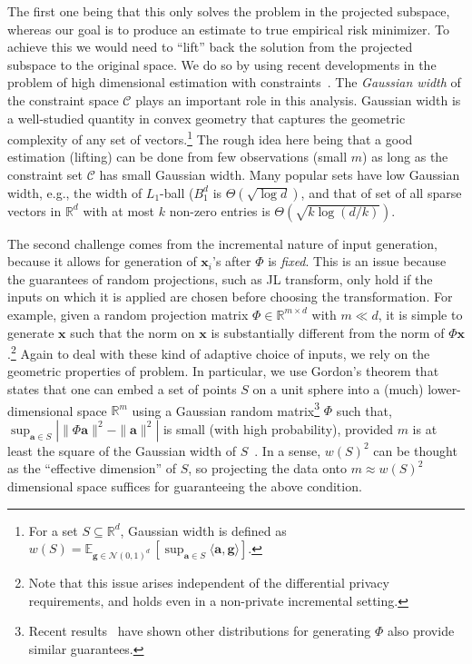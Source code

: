 \documentclass{article}
\theoremstyle{plain}
\def \CCC {\mathcal{C}}
\def \NNN {\mathcal{N}}
\def \E {\mathbb{E}}
\def \a {\mathbf a}
\def \g {\mathbf g}
\def \x {\mathbf x}
\def \R {\mathbb{R}}
\begin{document}
\begin{list}{{\bf ()}}{
\setlength{\leftmargin}{12pt}
\setlength{\listparindent}{\parindent}
\setlength{\parsep}{0pt}}
The first one being that this only solves the problem in the projected subspace, whereas our goal is to produce an estimate to true empirical risk minimizer. To achieve this we would need to ``lift'' back the solution from the projected subspace to the original space. We do so by using recent developments in the problem of high dimensional estimation with constraints~\cite{vershynin2014estimation}. The {\em Gaussian width} of the constraint space $\CCC$ plays an important role in this analysis. Gaussian width is a well-studied quantity in convex geometry that captures the geometric complexity of any set of vectors.\footnote{For a set $S \subseteq \R^d$, Gaussian width is defined as $w(S)=\E_{\g \in \NNN(0,1)^d}\, [\sup_{\a \in S} \langle \a, \g\rangle]$.} The rough idea here being that a good estimation (lifting) can be done from few observations (small $m$) as long as the constraint set $\CCC$ has small Gaussian width. Many popular sets have low Gaussian width, e.g., the width of $L_1$-ball ($B_1^d$ is $\Theta(\sqrt{\log d})$, and that of set of all sparse vectors in $\R^d$ with at most $k$ non-zero entries is $\Theta(\sqrt{k \log (d/k)})$.

The second challenge comes from the incremental nature of input generation, because it allows for generation of $\x_i$'s after $\Phi$ is {\em fixed}. This is an issue because the guarantees of random projections, such as JL transform, only hold if the inputs on which it is applied are chosen before choosing the transformation. For example, given a random projection matrix $\Phi \in \R^{m \times d}$ with $m \ll d$, it is simple to generate $\x$ such that the norm on $\x$ is substantially different from the norm of $\Phi \x$.\!\footnote{Note that this issue arises independent of the differential privacy requirements, and holds even in a non-private incremental setting.} Again to deal with these kind of adaptive choice of inputs, we rely on the geometric properties of problem. In particular, we use Gordon's theorem that states that one can embed a set of points $S$ on a unit sphere into a (much) lower-dimensional space $\R^m$ using a Gaussian random matrix\footnote{Recent results~\cite{bourgain2015toward} have shown other distributions for generating $\Phi$ also provide similar guarantees.} $\Phi$ such that, $\sup_{\a \in S} | \| \Phi \a\|^2 - \| \a \|^2 |$ is small (with high probability), provided $m$ is at least the square of the Gaussian width of $S$~\cite{gordon1988milman}. In a sense, $w(S)^2$ can be thought as the ``effective dimension'' of $S$, so projecting the data onto $m \approx w(S)^2$ dimensional space suffices for guaranteeing the above condition. 


\end{list}
\end{document}

